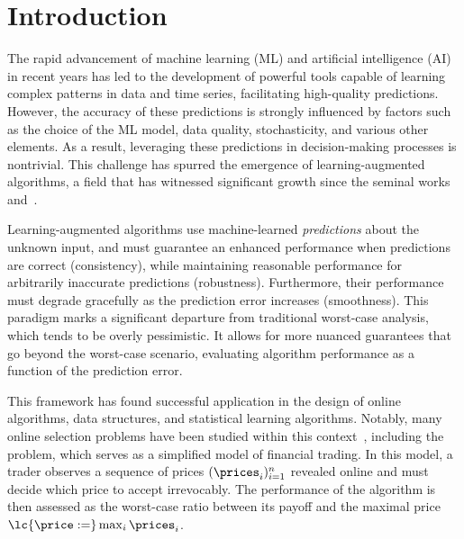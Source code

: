\section{Introduction}\label{sec:introduction}


 The rapid advancement of machine learning (ML) and artificial intelligence (AI) in recent years has led to the development of powerful tools capable of learning complex patterns in data and time series, facilitating high-quality predictions. However, the accuracy of these predictions is strongly influenced by factors such as the choice of the ML model, data quality, stochasticity, and various other elements. As a result, leveraging these predictions in decision-making processes is nontrivial. This challenge has spurred the emergence of learning-augmented algorithms, a field that has witnessed significant growth since the seminal works~\cite{DBLP:journals/jacm/LykourisV21} and~\cite{NIPS2018_8174}.

Learning-augmented algorithms use machine-learned {\em predictions} about the unknown input, and must guarantee an enhanced performance when predictions are correct (consistency), while maintaining reasonable performance for arbitrarily inaccurate predictions (robustness). Furthermore, their performance must degrade gracefully as the prediction error increases (smoothness). This paradigm marks a significant departure from traditional worst-case analysis, which tends to be overly pessimistic. It allows for more nuanced guarantees that go beyond the worst-case scenario, evaluating algorithm performance as a function of the prediction error.

This framework has found successful application in the design of online algorithms, data structures, and statistical learning algorithms. Notably, many online selection problems have been studied within this context~\cite{}, including the \OMS{} problem, which serves as a simplified model of financial trading. In this model, a trader observes a sequence of prices $(\prices_i)_{i=1}^n$ revealed online and must decide which price to accept irrevocably. The performance of the algorithm is then assessed as the worst-case ratio between its payoff and the maximal price $\lc{\price:=}\max_i \prices_i$. 


